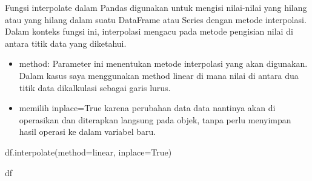 \documentclass[
  letterpaper,
]{krantz}
\makeatletter
\newenvironment{Shaded}{\begin{snugshade}}{\end{snugshade}}
\newcommand{\NormalTok}[1]{\textcolor[rgb]{0.00,0.23,0.31}{#1}}
\newcommand{\OperatorTok}[1]{\textcolor[rgb]{0.37,0.37,0.37}{#1}}
\newcommand{\StringTok}[1]{\textcolor[rgb]{0.13,0.47,0.30}{#1}}
\newcommand{\VariableTok}[1]{\textcolor[rgb]{0.07,0.07,0.07}{#1}}
\providecommand{\tightlist}{%
  \setlength{\itemsep}{0pt}\setlength{\parskip}{0pt}}\usepackage{longtable,booktabs,array}
\newenvironment{kframe}{%
\medskip{}
\setlength{\fboxsep}{.8em}
 \def\at@end@of@kframe{}%
 \ifinner\ifhmode%
  \def\at@end@of@kframe{\end{minipage}}%
  \begin{minipage}{\columnwidth}%
 \fi\fi%
 \def\FrameCommand##1{\hskip\@totalleftmargin \hskip-\fboxsep
 \colorbox{shadecolor}{##1}\hskip-\fboxsep
     \hskip-\linewidth \hskip-\@totalleftmargin \hskip\columnwidth}%
 \MakeFramed {\advance\hsize-\width
   \@totalleftmargin\z@ \linewidth\hsize
   \@setminipage}}%
 {\par\unskip\endMakeFramed%
 \at@end@of@kframe}
\renewenvironment{Shaded}{\begin{kframe}}{\end{kframe}}
\makeatother
\begin{document}
Fungsi interpolate dalam Pandas digunakan untuk mengisi nilai-nilai yang
hilang atau yang hilang dalam suatu DataFrame atau Series dengan metode
interpolasi. Dalam konteks fungsi ini, interpolasi mengacu pada metode
pengisian nilai di antara titik data yang diketahui.

\begin{itemize}
\tightlist
\item
  method: Parameter ini menentukan metode interpolasi yang akan
  digunakan. Dalam kasus saya menggunakan method linear di mana nilai di
  antara dua titik data dikalkulasi sebagai garis lurus.
\item
  memilih inplace=True karena perubahan data data nantinya akan di
  operasikan dan diterapkan langsung pada objek, tanpa perlu menyimpan
  hasil operasi ke dalam variabel baru.
\end{itemize}

\begin{Shaded}
\begin{Highlighting}[]
\NormalTok{df.interpolate(method}\OperatorTok{=}\StringTok{\textquotesingle{}linear\textquotesingle{}}\NormalTok{, inplace}\OperatorTok{=}\VariableTok{True}\NormalTok{)}

\NormalTok{df}
\end{Highlighting}
\end{Shaded}
\end{document}
